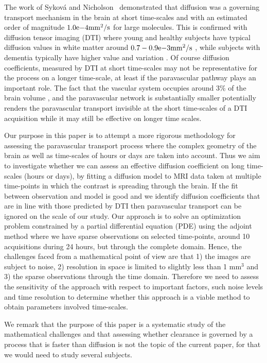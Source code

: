 \documentclass[12pt,a4paper]{article}
\begin{document}
The work of Sykov{\'a} and Nicholson~\cite{sykova2008diffusion} demonstrated
that diffusion was a governing transport mechanism in the brain at short time-scales and with an estimated order of magnitude $1.0\mathrm{e}{-4} \mathrm{mm\sp{2}/s}$ for large molecules. This is confirmed with diffusion tensor imaging (DTI) where young and healthy subjects have typical diffusion values in white matter around $0.7-0.9\mathrm{e}{-3} \mathrm{mm\sp{2}/s}$ \citet{Helenius194},
while subjects with dementia typically have higher value and variation \cite{goujon2018can}. Of course diffusion coefficients, 
measured by DTI at short time-scales may not be representative for the process on a
longer time-scale, at least if the paravascular pathway plays an important role. The fact that the vascular system occupies around 3\% of the brain volume  \cite{nicholson2001diffusion},
and the paravascular network is substantially smaller potentially renders the paravascular transport  invisible at the short time-scales of a DTI acquisition while it may still be effective on longer time scales. 


Our purpose in this paper is to attempt a more rigorous methodology 
for assessing the paravascular transport process where
the complex geometry of the brain as well as time-scales of hours or days are taken into account.
Thus we aim to investigate whether we can assess an effective diffusion coefficient on long time-scales (hours or days), by fitting a diffusion model to MRI data taken at multiple time-points in which the contrast is spreading through the brain. If the fit between observation and model is good and we identify diffusion coefficients that are 
in line with those predicted by DTI then paravascular transport can be ignored on the scale of our study. 
Our approach is to solve an optimization problem constrained by a partial differential equation (PDE) using the adjoint method where we have sparse observations on selected time-points, around 10 acquisitions during 24 hours, but through
the complete domain. Hence, the challenges faced from a mathematical point of view 
are that 1) the images are subject to noise, 2) resolution in space is limited to slightly less than 1 $\mathrm{mm}^3$ and 3)
the sparse observations through the time domain. 
Therefore we need to assess the sensitivity of the approach with respect to important factors, such noise levels and time resolution to determine whether this approach is a viable method to obtain parameters involved time-scales. 

We remark that the purpose
of this paper is a systematic study of the mathematical challenges and that assessing  
whether clearance is governed by a process that is faster than diffusion is not the topic of the current paper, 
for that we would need to study several subjects. 
\end{document}
